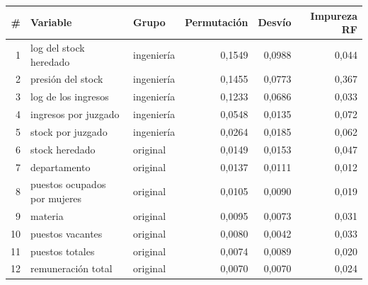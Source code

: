 \begin{tabular}{rllrrr}
\toprule
\# & Variable & Grupo & Permutación & Desvío & Impureza RF \\
\midrule
1 & log del stock heredado & ingeniería & 0,1549 & 0,0988 & 0,044 \\
2 & presión del stock & ingeniería & 0,1455 & 0,0773 & 0,367 \\
3 & log de los ingresos & ingeniería & 0,1233 & 0,0686 & 0,033 \\
4 & ingresos por juzgado & ingeniería & 0,0548 & 0,0135 & 0,072 \\
5 & stock por juzgado & ingeniería & 0,0264 & 0,0185 & 0,062 \\
6 & stock heredado & original & 0,0149 & 0,0153 & 0,047 \\
7 & departamento & original & 0,0137 & 0,0111 & 0,012 \\
8 & puestos ocupados por mujeres & original & 0,0105 & 0,0090 & 0,019 \\
9 & materia & original & 0,0095 & 0,0073 & 0,031 \\
10 & puestos vacantes & original & 0,0080 & 0,0042 & 0,033 \\
11 & puestos totales & original & 0,0074 & 0,0089 & 0,020 \\
12 & remuneración total & original & 0,0070 & 0,0070 & 0,024 \\
\bottomrule
\end{tabular}
